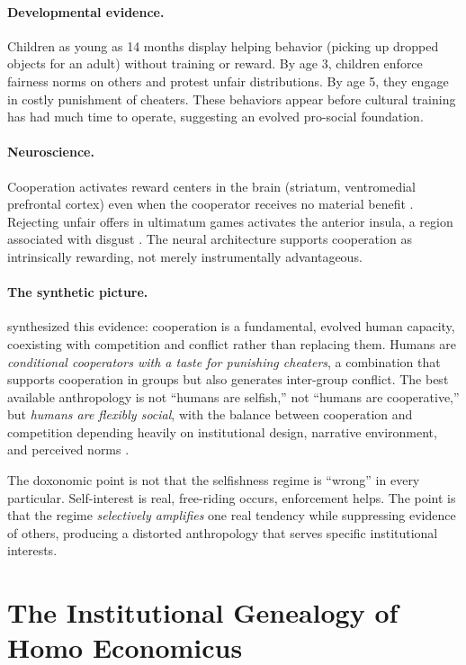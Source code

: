 \paragraph{Developmental evidence.}
Children as young as 14 months display helping behavior (picking up dropped objects for an adult) without training or reward.
By age 3, children enforce fairness norms on others and protest unfair distributions.
By age 5, they engage in costly punishment of cheaters.
These behaviors appear before cultural training has had much time to operate, suggesting an evolved pro-social foundation.

\paragraph{Neuroscience.}
Cooperation activates reward centers in the brain (striatum, ventromedial prefrontal cortex) even when the cooperator receives no material benefit \autocite{rilling2002}.
Rejecting unfair offers in ultimatum games activates the anterior insula, a region associated with disgust \autocite{sanfey2003}.
The neural architecture supports cooperation as intrinsically rewarding, not merely instrumentally advantageous.

\paragraph{The synthetic picture.}
\textcite{bowles2011} synthesized this evidence: cooperation is a fundamental, evolved human capacity, coexisting with competition and conflict rather than replacing them.
Humans are \emph{conditional cooperators with a taste for punishing cheaters}, a combination that supports cooperation in groups but also generates inter-group conflict.
The best available anthropology is not ``humans are selfish,'' not ``humans are cooperative,'' but \emph{humans are flexibly social}, with the balance between cooperation and competition depending heavily on institutional design, narrative environment, and perceived norms \autocite{gintis2005}.

The doxonomic point is not that the selfishness regime is ``wrong'' in every particular. Self-interest is real, free-riding occurs, enforcement helps.
The point is that the regime \emph{selectively amplifies} one real tendency while suppressing evidence of others, producing a distorted anthropology that serves specific institutional interests.

\section{The Institutional Genealogy of Homo Economicus}
\label{sec:ch21-genealogy}

